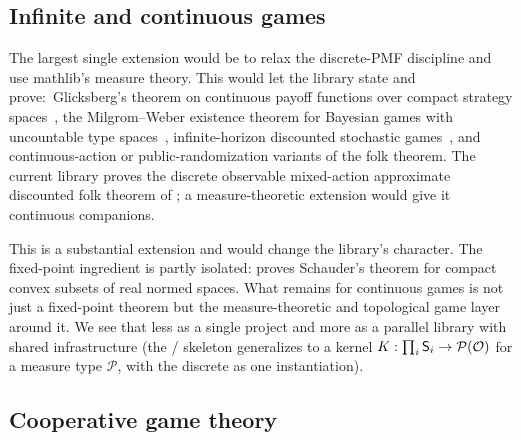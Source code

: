 \subsection{Infinite and continuous games}
\label{sec:future:infinite}

The largest single extension would be to relax the discrete-PMF
discipline and use mathlib's measure theory.  This would let the
library state and prove:\ Glicksberg's theorem on continuous
payoff functions over compact strategy
spaces~\citep{Glicksberg1952}, the Milgrom–Weber existence theorem
for Bayesian games with uncountable type
spaces~\citep{MilgromWeber1985}, infinite-horizon discounted
stochastic games~\citep{Shapley1953stochastic, MertensNeyman1981},
and continuous-action or public-randomization variants of the folk
theorem.  The current library proves the discrete observable
mixed-action approximate discounted folk theorem of
; a measure-theoretic extension would
give it continuous companions.

This is a substantial extension and would change the library's
character.  The fixed-point ingredient is partly isolated:
 proves Schauder's theorem for
compact convex subsets of real normed spaces.  What remains for
continuous games is not just a fixed-point theorem but the
measure-theoretic and topological game layer around it.  We see
that less as a single project and more as a parallel library with
shared infrastructure (the
/ skeleton generalizes to a kernel
$K : \prod_i \mathsf{S}_i \to \mathcal{P}(\mathcal{O})$ for a measure
type $\mathcal{P}$, with the discrete  as one
instantiation).

\subsection{Cooperative game theory}
\label{sec:future:cooperative}

